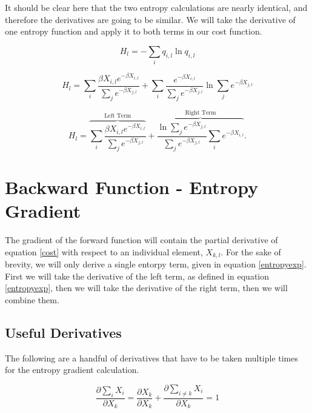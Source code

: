 \noindent It should be clear here that the two entropy calculations are nearly identical, and therefore the derivatives are going to be similar. We will take the derivative of one entropy function and apply it to both terms in our cost function.

\begin{displaymath}
    H_{l} = - \sum_{i} q_{i,l} \ln q_{i,l}
\end{displaymath}

\begin{displaymath}
    H_{l} =
    \sum_{i}\frac{\beta X_{i,l} e^{-\beta X_{i,l}}}{\sum_{j}e^{-\beta X_{j,l}}} + 
    \sum_{i}\frac{e^{-\beta X_{i,l}}}{\sum_{j}e^{-\beta X_{j,l}}}\ln{\sum_{j}e^{-\beta X_{j,l}}}
\end{displaymath}

\begin{equation} \label{entropyexp}
    H_{l} =
    \overbrace{\sum_{i}\frac{\beta X_{i,l}e^{-\beta X_{i,l}}}{\sum_{j}e^{-\beta X_{j,l}}}}^\text{Left Term} + 
    \overbrace{\frac{\ln{\sum_{j}e^{-\beta X_{j,l}}}}{\sum_{j}e^{-\beta X_{j,l}}}\sum_{i}e^{-\beta X_{i,l}}}^\text{Right Term}.
\end{equation}

\section{Backward Function - Entropy Gradient} \label{backward}
\noindent The gradient of the forward function will contain the partial derivative of equation \ref{cost} with respect to an individual element, $X_{k,l}$. For the sake of brevity, we will only derive a single entorpy term, given in equation \ref{entropyexp}. First we will take the derivative of the left term, as defined in equation \ref{entropyexp}, then we will take the derivative of the right term, then we will combine them.

\subsection{Useful Derivatives} \label{derivatives}
\noindent The following are a handful of derivatives that have to be taken multiple times for the entropy gradient calculation.

\begin{equation} \label{dx}
    \frac{\partial\sum_{i}X_i}{\partial X_{k}} = \frac{\partial X_{k}}{\partial X_{k}} + \frac{\partial \sum_{i \ne k} X_{i}}{\partial X_{k}} = 1
\end{equation}


